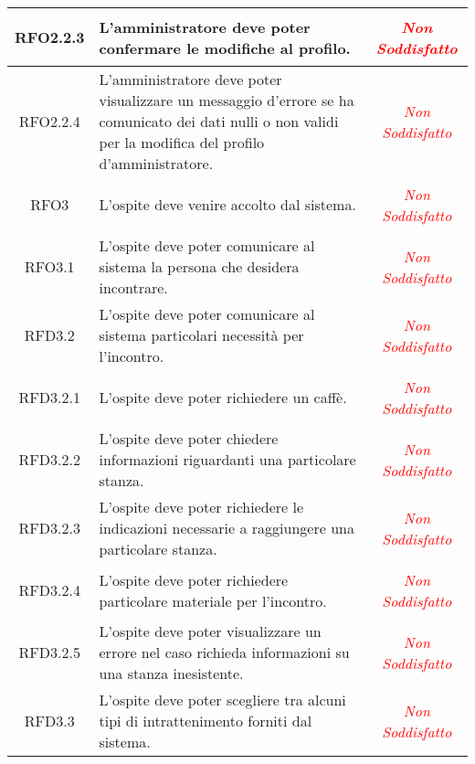 \begin{longtable}{|c|>{\centering}m{7cm}|c|}
\hypertarget{RFO2.2.3}{RFO2.2.3} & L'amministratore deve poter confermare le modifiche al profilo. & \textcolor{red}{\textit{Non Soddisfatto}}\\ \hline

\hypertarget{RFO2.2.4}{RFO2.2.4} & L'amministratore deve poter visualizzare un messaggio d'errore se ha comunicato dei dati nulli o non validi per la modifica del profilo d'amministratore. & \textcolor{red}{\textit{Non Soddisfatto}}\\ \hline

\hypertarget{RFO3}{RFO3} & L'ospite deve venire accolto dal sistema. & \textcolor{red}{\textit{Non Soddisfatto}}\\ \hline

\hypertarget{RFO3.1}{RFO3.1} & L'ospite deve poter comunicare al sistema la persona che desidera incontrare. & \textcolor{red}{\textit{Non Soddisfatto}}\\ \hline

\hypertarget{RFD3.2}{RFD3.2} & L'ospite deve poter comunicare al sistema particolari necessità  per l'incontro. & \textcolor{red}{\textit{Non Soddisfatto}}\\ \hline

\hypertarget{RFD3.2.1}{RFD3.2.1} & L'ospite deve poter richiedere un caffè. & \textcolor{red}{\textit{Non Soddisfatto}}\\ \hline

\hypertarget{RFD3.2.2}{RFD3.2.2} & L'ospite deve poter chiedere informazioni riguardanti una particolare stanza. & \textcolor{red}{\textit{Non Soddisfatto}}\\ \hline

\hypertarget{RFD3.2.3}{RFD3.2.3} & L'ospite deve poter richiedere le indicazioni necessarie a raggiungere una particolare stanza. & \textcolor{red}{\textit{Non Soddisfatto}}\\ \hline

\hypertarget{RFD3.2.4}{RFD3.2.4} & L'ospite deve poter richiedere particolare materiale per l'incontro. & \textcolor{red}{\textit{Non Soddisfatto}}\\ \hline

\hypertarget{RFD3.2.5}{RFD3.2.5} & L'ospite deve poter visualizzare un errore nel caso richieda informazioni su una stanza inesistente. & \textcolor{red}{\textit{Non Soddisfatto}}\\ \hline

\hypertarget{RFD3.3}{RFD3.3} & L'ospite deve poter scegliere tra alcuni tipi di intrattenimento forniti dal sistema. & \textcolor{red}{\textit{Non Soddisfatto}}\\ \hline


\end{longtable}
